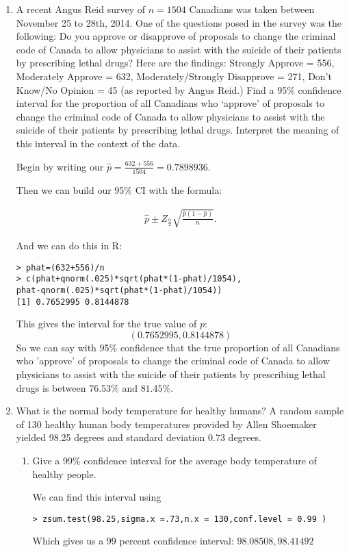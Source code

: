 \documentclass{article}
\begin{document}
\begin{enumerate}
\item A recent Angus Reid survey of $n = 1504$ Canadians was taken between November 25 to 28th, 2014. One of
the questions posed in the survey was the following:
Do you approve or disapprove of proposals to change the criminal code of Canada to allow physicians to
assist with the suicide of their patients by prescribing lethal drugs? Here are the findings: Strongly Approve
= 556, Moderately Approve = 632, Moderately/Strongly Disapprove = 271, Don’t Know/No Opinion = 45
(as reported by Angus Reid.)
Find a 95\% confidence interval for the proportion of all Canadians who ‘approve’ of proposals to change the
criminal code of Canada to allow physicians to assist with the suicide of their patients by prescribing lethal
drugs. Interpret the meaning of this interval in the context of the data.

Begin by writing our $\hat{p}=\frac{632+556}{1504}=0.7898936$.

Then we can build our 95\% CI with the formula:

\begin{align*}
\hat{p}\pm Z_{\frac{\alpha}{2}}\sqrt{ \frac{\hat{p}(1-\hat{p})}{n}}
.\end{align*}

And we can do this in R:

\begin{verbatim}
> phat=(632+556)/n
> c(phat+qnorm(.025)*sqrt(phat*(1-phat)/1054),
phat-qnorm(.025)*sqrt(phat*(1-phat)/1054))
[1] 0.7652995 0.8144878
\end{verbatim}

This gives the interval for the true value of $p$:
$$(0.7652995, 0.8144878)$$
So we can say with 95\% confidence that the true proportion of all Canadians who 'approve' of proposals to change the criminal code of Canada to allow physicians to assist with the suicide of their patients by prescribing lethal drugs is between $76.53\%$ and $81.45\%$.

\item What is the normal body temperature for healthy humans? A random sample of 130 healthy human body
temperatures provided by Allen Shoemaker yielded 98.25 degrees and standard deviation 0.73 degrees.
\begin{enumerate}[label= (\alph*)] 
\item Give a 99\% confidence interval for the average body temperature of healthy people.

We can find this interval using 
\begin{verbatim}
> zsum.test(98.25,sigma.x =.73,n.x = 130,conf.level = 0.99 ) 
\end{verbatim}
Which gives us a 99 percent confidence interval: $98.08508, 98.41492$


\end{enumerate}
\end{enumerate}
\end{document}
